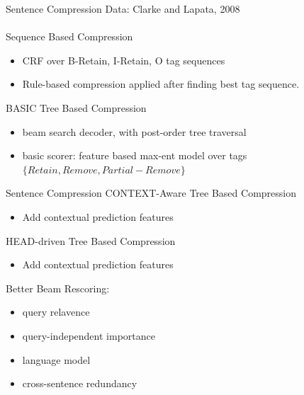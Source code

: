 \documentclass[xcolor={table}]{beamer}
\begin{document}
\begin{frame}{\cite{wang2013sentence} Sentence Compression}
    Data: Clarke and Lapata, 2008
~\\~\\
    Sequence Based Compression
    \begin{itemize}
        \item CRF over B-Retain, I-Retain, O tag sequences
        \item Rule-based compression applied after finding best tag sequence.
    \end{itemize}
    BASIC Tree Based Compression
    \begin{itemize}
            \small
        \item beam search decoder, with post-order tree traversal
        \item basic scorer: feature based max-ent model over tags 
            $\{Retain, Remove, Partial-Remove\}$ 
    \end{itemize}
\end{frame}
\begin{frame}{\cite{wang2013sentence} Sentence Compression}
    CONTEXT-Aware Tree Based Compression
    \begin{itemize}
            \small
        \item Add contextual prediction features 
    \end{itemize}
    HEAD-driven Tree Based Compression
    \begin{itemize}
            \small
        \item Add contextual prediction features
    \end{itemize}
    Better Beam Rescoring:
    \begin{itemize}
            \small
        \item query relavence
        \item query-independent importance
        \item language model
        \item cross-sentence redundancy
    \end{itemize}    

\end{frame}
\end{document}
